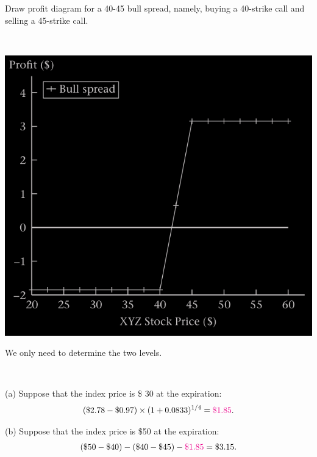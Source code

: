 \begin{frame}[fragile,t]
	\begin{myexample}
		Draw profit diagram for a 40-45	bull spread, namely, buying a 40-strike call and selling
		a 45-strike call.
	\end{myexample}
	\pause
	\begin{mysol}\phantom{a}\\
		\begin{center}
			\includegraphics[scale=0.2]{figs/Figure-3-7.png}
		\end{center}

		We only need to determine the two levels.
	\end{mysol}
\end{frame}
\begin{frame}[fragile,t]
	\begin{mysol}[(Continued)]\\
		\bigskip

		(a)	 Suppose that the index price is \$ 30 at the expiration:
		\begin{align*}
			\left(\$ 2.78 - \$ 0.97 \right) \times (1+0.0833)^{1/4} = \textcolor{magenta}{\$ 1.85}.
		\end{align*}
		\bigskip \pause

		(b) Suppose that the index price is \$50 at the expiration:
		\begin{align*}
			(\$50 - \$40) - (\$ 40 - \$ 45) - \textcolor{magenta}{\$ 1.85} = \$ 3.15.
		\end{align*}
		\myEnd
	\end{mysol}
\end{frame}
